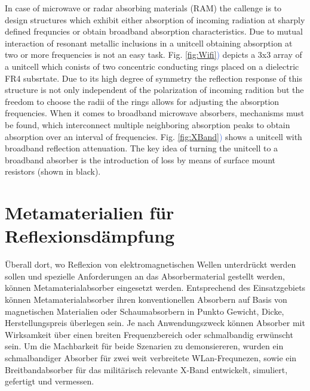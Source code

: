 \documentclass[a4paper,12pt]{scrartcl}  %
\newcommand{\capFref}[1]{Fig. \ref{#1}\textcolor{RoyalBlue}{)}}
\begin{document}
In case of microwave or radar absorbing materials (RAM) the callenge is to design structures
which exhibit either absorption of incoming radiation at sharply defined frequncies or obtain broadband
absorption characteristics. 
Due to mutual interaction of resonant metallic inclusions in a unitcell obtaining absorption at two or more 
frequencies is not an easy task. \capFref{fig:Wifi} depicts a 3x3 array of a unitcell which conists of two concentric conducting rings placed on a dielectric FR4 subsrtate. Due to its high degree of symmetry the reflection response of this structure is not only independent of the polarization of incoming radition but 
the freedom to choose the radii of the rings allows for adjusting the absorption frequencies.
When it comes to broadband microwave absorbers, mechanisms must be found, which interconnect multiple neighboring absorption peaks to obtain absorption over an interval of frequencies. \capFref{fig:XBand} shows 
a unitcell with broadband reflection attenuation. The key idea of turning the unitcell to a broadband absorber is the introduction of loss by means of surface mount resistors (shown in black).

\section{Metamaterialien für Reflexionsdämpfung}
Überall dort, wo Reflexion von elektromagnetischen Wellen unterdrückt werden sollen
und spezielle Anforderungen an das Absorbermaterial gestellt werden, können 
Metamaterialabsorber eingesetzt werden. 
Entsprechend des Einsatzgebiets können Metamaterialabsorber ihren konventionellen
Absorbern auf Basis von magnetischen Materialien oder Schaumabsorbern in Punkto Gewicht, Dicke, Herstellungspreis überlegen sein. Je nach Anwendungszweck können Absorber mit
Wirksamkeit über einen breiten Frequenzbereich oder schmalbandig erwünscht sein. 
Um die Machbarkeit für beide Szenarien zu demonsiereren, wurden ein schmalbandiger Absorber für zwei weit verbreitete WLan-Frequnezen, sowie ein Breitbandabsorber für das militärisch relevante X-Band entwickelt, simuliert, gefertigt und vermessen.
\end{document}
